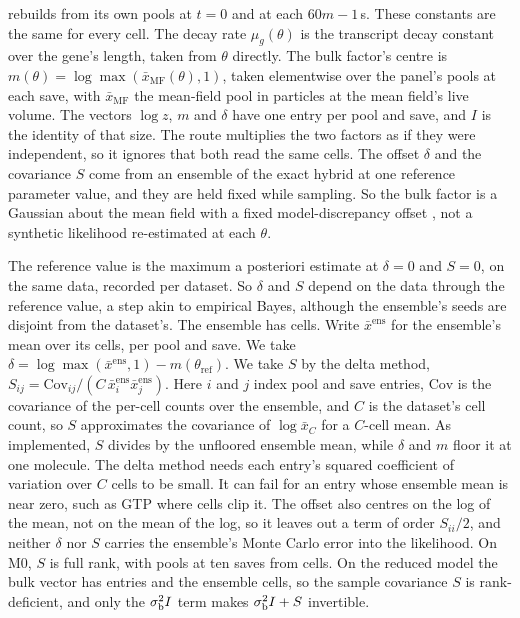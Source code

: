 rebuilds from its own pools at $t = 0$ and at each $60m - 1$\,s. These constants are the
same for every cell. The decay rate $\mu_g(\theta)$ is the transcript decay constant over
the gene's length, taken from $\theta$ directly. The bulk factor's centre is $m(\theta) = \log \max(\bar{x}_{\mathrm{MF}}(\theta), 1)$,
taken elementwise over the panel's pools at each save, with $\bar{x}_{\mathrm{MF}}$ the
mean-field pool in particles at the mean field's live volume. The vectors $\log z$, $m$ and
$\delta$ have one entry per pool and save, and $I$ is the identity of that size. The route
multiplies the two factors as if they were independent, so it ignores that both read the
same cells. The offset $\delta$ and the covariance $S$ come from an ensemble of the exact
hybrid at one reference parameter value, and they are held fixed while sampling. So the
bulk factor is a Gaussian about the mean field with a fixed model-discrepancy offset
\cite{kennedy2001bayesian}, not a synthetic likelihood re-estimated at each $\theta$.

The reference
value is the maximum a posteriori estimate at $\delta = 0$ and $S = 0$, on the same data,
recorded per dataset. So $\delta$ and $S$ depend on the data through the reference value,
a step akin to empirical Bayes, although the ensemble's seeds are disjoint from the
dataset's. The ensemble has  cells. Write $\bar{x}^{\mathrm{ens}}$ for the
ensemble's mean over its cells, per pool and save. We take
$\delta = \log \max(\bar{x}^{\mathrm{ens}}, 1) - m(\theta_{\mathrm{ref}})$. We take $S$ by
the delta method, $S_{ij} = \mathrm{Cov}_{ij} / (C\, \bar{x}^{\mathrm{ens}}_i \bar{x}^{\mathrm{ens}}_j)$.
Here $i$ and $j$ index pool and save entries, $\mathrm{Cov}$ is the covariance of the
per-cell counts over the ensemble, and $C$ is the dataset's cell count, so $S$
approximates the covariance of $\log \bar{x}_C$ for a $C$-cell mean. As implemented, $S$
divides by the unfloored ensemble mean, while $\delta$ and $m$ floor it at one molecule.
The delta method needs each entry's squared coefficient of variation over $C$ cells to be
small. It can fail for an entry whose ensemble mean is near zero, such as GTP where cells
clip it. The offset also centres on the log of the mean, not on the mean of the log, so
it leaves out a term of order $S_{ii}/2$, and neither $\delta$ nor $S$ carries the
ensemble's Monte Carlo error into the likelihood. On M0, $S$ is full rank, with
 pools at ten saves from  cells. On the reduced model the
bulk vector has  entries and the ensemble  cells, so
the sample covariance $S$ is rank-deficient, and only the $\sigma_{\mathrm{b}}^2 I$ term makes
$\sigma_{\mathrm{b}}^2 I + S$ invertible.

